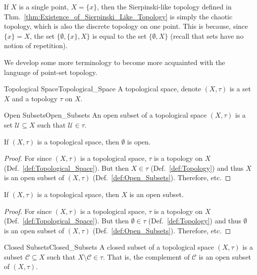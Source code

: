     If $X$ is a single point, $X=\{x\}$, then the Sierpinski-like topology
    defined in Thm.~\ref{thm:Existence_of_Sierpinski_Like_Topology} is simply
    the chaotic topology, which is also the discrete topology on one point.
    This is because, since $\{x\}=X$, the set $\{\emptyset,\{x\},X\}$ is equal
    to the set $\{\emptyset,X\}$ (recall that sets have no notion of
    repetition).
    \par\hfill\par
    We develop some more terminology to become more acquainted with the language
    of point-set topology.
    \begin{fdefinition}{Topological Space}{Topological_Space}
        A \gls{topological space}, denote $(X,\tau)$ is a \gls{set} $X$ and a
        \gls{topology} $\tau$ on $X$.
    \end{fdefinition}
    \begin{ldefinition}{Open Subsets}{Open_Subsets}
        An open subset of a topological space $(X,\tau)$ is a set
        $\mathcal{U}\subseteq{X}$ such that $\mathcal{U}\in\tau$.
    \end{ldefinition}
    \begin{theorem}
        \label{thm:Emptyset_Is_Open}%
        If $(X,\tau)$ is a topological space, then $\emptyset$ is open.
    \end{theorem}
    \begin{proof}
        For since $(X,\tau)$ is a topological space, $\tau$ is a topology on $X$
        (Def.~\ref{def:Topological_Space}). But then
        $X\in\tau$ (Def.~\ref{def:Topology}) and thus $X$ is an open subset of
        $(X,\tau)$ (Def.~\ref{def:Open_Subsets}). Therefore, etc.
    \end{proof}
    \begin{theorem}
        \label{thm:Whole_Space_Is_Open}%
        If $(X,\tau)$ is a topological space, then $X$ is an open subset.
    \end{theorem}
    \begin{proof}
        For since $(X,\tau)$ is a topological space, $\tau$ is a topology on $X$
        (Def.~\ref{def:Topological_Space}). But then $\emptyset\in\tau$
        (Def.~\ref{def:Topology}) and thus $\emptyset$ is an open subset of
        $(X,\tau)$ (Def.~\ref{def:Open_Subsets}). Therefore, etc.
    \end{proof}
    \begin{ldefinition}{Closed Subsets}{Closed_Subsets}
        A closed subset of a topological space $(X,\tau)$ is a subset
        $\mathcal{C}\subseteq{X}$ such that $X\setminus\mathcal{C}\in\tau$.
        That is, the complement of $\mathcal{C}$ is an open subset of
        $(X,\tau)$.
    \end{ldefinition}
